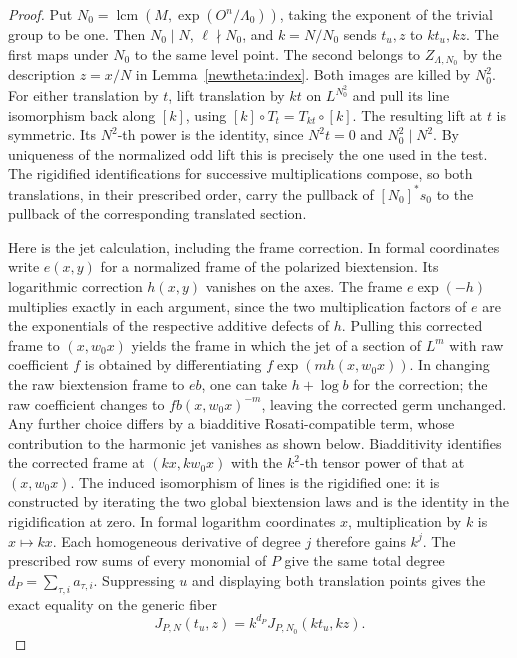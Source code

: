 \begin{proof}
Put \(N_0=\operatorname{lcm}(M,\exp(O^n/\Lambda_0))\), taking
the exponent of the trivial group to be one. Then \(N_0\mid N\),
\(\ell\nmid N_0\), and \(k=N/N_0\) sends \(t_u,z\) to \(kt_u,kz\).
The first maps under \(N_0\) to the same level point. The second
belongs to \(Z_{\Lambda,N_0}\) by the description \(z=x/N\)
in Lemma~\ref{newtheta:index}. Both images are killed by \(N_0^2\).
For either translation by \(t\), lift translation by \(kt\) on
\(L^{N_0^2}\) and pull its line isomorphism back along \([k]\),
using \([k]\circ T_t=T_{kt}\circ[k]\).
The resulting lift at \(t\) is symmetric. Its \(N^2\)-th power is
the identity, since \(N^2t=0\) and \(N_0^2\mid N^2\).
By uniqueness of the normalized odd lift this is precisely the
one used in the test. The rigidified identifications for successive
multiplications compose, so both translations, in their prescribed
order, carry the pullback of \([N_0]^*s_0\) to the pullback of
the corresponding translated section.

Here is the jet calculation, including the frame correction.
In formal coordinates write \(e(x,y)\) for a normalized frame of
the polarized biextension. Its logarithmic correction \(h(x,y)\)
vanishes on the axes. The frame \(e\exp(-h)\) multiplies exactly
in each argument, since the two multiplication factors of \(e\)
are the exponentials of the respective additive defects of \(h\).
Pulling this corrected frame to \((x,w_0x)\) yields the frame in
which the jet of a section of \(L^m\) with raw coefficient \(f\)
is obtained by differentiating \(f\exp(mh(x,w_0x))\).
In changing the raw biextension frame to \(e b\), one can take
\(h+\log b\) for the correction; the raw coefficient changes to
\(f b(x,w_0x)^{-m}\), leaving the corrected germ unchanged.
Any further choice differs by a biadditive Rosati-compatible term,
whose contribution to the harmonic jet vanishes as shown below.
Biadditivity identifies the corrected frame at \((kx,kw_0x)\)
with the \(k^2\)-th tensor power of that at \((x,w_0x)\).
The induced isomorphism of lines is the rigidified one: it is
constructed by iterating the two global biextension laws and is
the identity in the rigidification at zero. In formal logarithm
coordinates \(x\), multiplication by \(k\) is \(x\mapsto kx\).
Each homogeneous derivative of degree \(j\) therefore gains \(k^j\).
The prescribed row sums of every monomial of \(P\) give the same total
degree \(d_P=\sum_{\tau,i}a_{\tau,i}\).
Suppressing \(u\) and displaying both translation points gives the
exact equality on the generic fiber
\[
       J_{P,N}(t_u,z)=k^{d_P} J_{P,N_0}(kt_u,kz).
\]


\end{proof}
